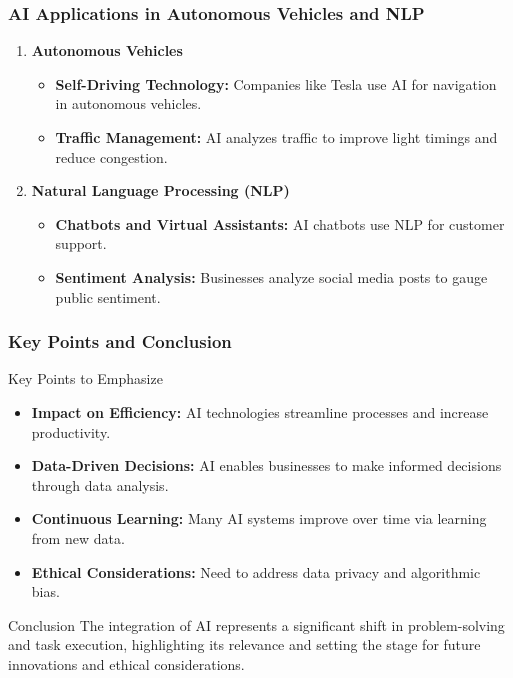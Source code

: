 \documentclass[aspectratio=169]{beamer}
\begin{document}
\begin{frame}[fragile]
  \frametitle{AI Applications in Autonomous Vehicles and NLP}
  \begin{enumerate}
    \item \textbf{Autonomous Vehicles}
      \begin{itemize}
        \item \textbf{Self-Driving Technology:} Companies like Tesla use AI for navigation in autonomous vehicles.
        \item \textbf{Traffic Management:} AI analyzes traffic to improve light timings and reduce congestion.
      \end{itemize}

    \item \textbf{Natural Language Processing (NLP)}
      \begin{itemize}
        \item \textbf{Chatbots and Virtual Assistants:} AI chatbots use NLP for customer support.
        \item \textbf{Sentiment Analysis:} Businesses analyze social media posts to gauge public sentiment.
      \end{itemize}
  \end{enumerate}
\end{frame}

\begin{frame}[fragile]
  \frametitle{Key Points and Conclusion}
  \begin{block}{Key Points to Emphasize}
    \begin{itemize}
      \item \textbf{Impact on Efficiency:} AI technologies streamline processes and increase productivity.
      \item \textbf{Data-Driven Decisions:} AI enables businesses to make informed decisions through data analysis.
      \item \textbf{Continuous Learning:} Many AI systems improve over time via learning from new data.
      \item \textbf{Ethical Considerations:} Need to address data privacy and algorithmic bias.
    \end{itemize}
  \end{block}

  \begin{block}{Conclusion}
    The integration of AI represents a significant shift in problem-solving and task execution, highlighting its relevance and setting the stage for future innovations and ethical considerations.
  \end{block}
\end{frame}
\end{document}
